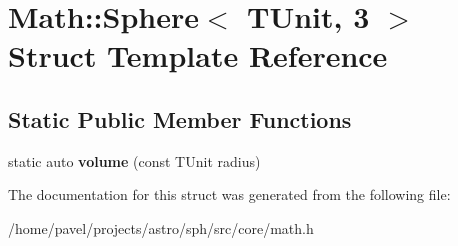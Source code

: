 \hypertarget{structMath_1_1Sphere_3_01TUnit_00_013_01_4}{}\section{Math\+:\+:Sphere$<$ T\+Unit, 3 $>$ Struct Template Reference}
\label{structMath_1_1Sphere_3_01TUnit_00_013_01_4}
\subsection*{Static Public Member Functions}
\begin{DoxyCompactItemize}
\item 
\hypertarget{structMath_1_1Sphere_3_01TUnit_00_013_01_4_a3d1e2b519ccf98afde938a86ee332b67}{}\label{structMath_1_1Sphere_3_01TUnit_00_013_01_4_a3d1e2b519ccf98afde938a86ee332b67} 
static auto {\bfseries volume} (const T\+Unit radius)
\end{DoxyCompactItemize}


The documentation for this struct was generated from the following file\+:\begin{DoxyCompactItemize}
\item 
/home/pavel/projects/astro/sph/src/core/math.\+h\end{DoxyCompactItemize}
